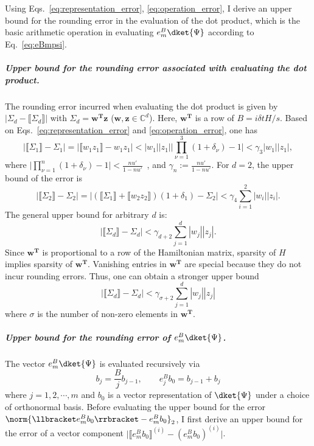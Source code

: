 Using Eqs.~\eqref{eq:representation_error}, \eqref{eq:operation_error}, I derive an upper bound for the rounding error in the evaluation of the dot product, which is the basic arithmetic operation in evaluating $e^B_m\dket{\Psi}$ according to Eq.~\eqref{eq:eBmpsi}.

\subparagraph{Upper bound for the rounding error associated with evaluating the dot product.}
The rounding error incurred when evaluating the dot product is given by $|\Sigma_d-\llbracket \Sigma_d\rrbracket|$ with $\Sigma_d=\boldsymbol{w^\text{T}z}$ ($\boldsymbol{w},\boldsymbol {z} \in\mathbb{C}^{d}$). Here, $\boldsymbol{w^\text{T}}$ is a row of $B=i\delta t H/s$. Based on Eqs.~\eqref{eq:representation_error} and \eqref{eq:operation_error}, one has
\begin{equation}
\label{eq:c7}
    |\llbracket \Sigma_1\rrbracket-\Sigma_1|=|\llbracket w_1  z_1\rrbracket-w_1z_1|<|w_1||z_1|\big|\prod_{\nu=1}^3(1+\delta_\nu)-1\big|<\gamma_3 |w_1||z_1|,
\end{equation}
where $\big|\prod_{\nu=1}^n(1+\delta_\nu)-1\big|<\frac{nu'}{1-nu'}$~\cite{higham2002accuracy}, and $\gamma_n:=\frac{nu'}{1-nu'}$. For $d=2$, the upper bound of the error is
\begin{equation}
\label{eq:c8}
     |\llbracket \Sigma_2\rrbracket-\Sigma_2|=|(\llbracket \Sigma_1\rrbracket+\llbracket w_2 z_2\rrbracket )(1+\delta_1)-\Sigma_2|<\gamma_4\sum_{i=1}^2|w_i||z_i|.
\end{equation}
The general upper bound for arbitrary $d$ is:
\begin{equation}
    |\llbracket \Sigma_d\rrbracket-\Sigma_d| <\gamma_{d+2}\sum_{j=1}^{d}|w_j|| z_j|.
\end{equation}
Since $\boldsymbol{w^\text{T}}$ is proportional to a row of the Hamiltonian matrix, sparsity of $H$ implies sparsity of $\boldsymbol{w^\text{T}}$. Vanishing entries in $\boldsymbol{w^\text{T}}$ are special because they do not incur rounding errors. Thus, one can obtain a stronger upper bound
\begin{equation}
\label{eq:C10}
    |\llbracket \Sigma_d\rrbracket-\Sigma_d|<\gamma_{\sigma+2}\sum_{j=1}^{d}|w_j|| z_j|
\end{equation}
where $\sigma$ is the number of non-zero elements in $\boldsymbol{w^\text{T}}$.

\subparagraph{Upper bound for the rounding error of $e^B_m\dket{\Psi}$.}
The vector $e^B_m\dket{\Psi}$ is evaluated recursively via
\begin{equation}
\label{eq:recursive_relation_1}
    b_j= \frac{B}{j}b_{j-1},\qquad e^B_j b_0=b_{j-1}+b_j
\end{equation}
where $j=1,2,\cdots,m$ and $b_0$ is a vector representation of $\dket{\Psi}$ under a choice of orthonormal basis. Before evaluating the upper bound for the error $\norm{\llbracket e^B_mb_0\rrbracket-e^B_mb_0}_2$, I first derive an upper bound for the error of a vector component $\big|\llbracket e^B_mb_0 \rrbracket^{(i)}-(e^B_mb_0) ^{(i)}\big|$.

